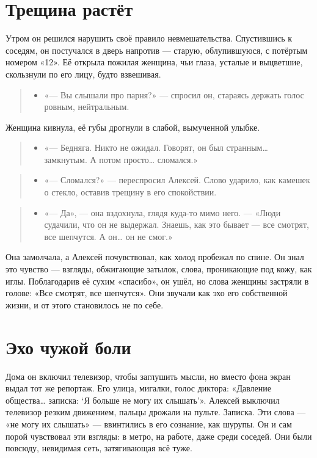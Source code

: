 \documentclass[12pt,a4paper]{book}
\newenvironment{dialogue}{\begin{quote}\itshape\begin{itemize}\item[]}{\end{itemize}\end{quote}}
\begin{document}
\section{Трещина растёт}

Утром он решился нарушить своё правило невмешательства. Спустившись к соседям, он постучался в дверь напротив — старую, облупившуюся, с потёртым номером «12». Её открыла пожилая женщина, чьи глаза, усталые и выцветшие, скользнули по его лицу, будто взвешивая.

\begin{dialogue}
«— Вы слышали про парня?» — спросил он, стараясь держать голос ровным, нейтральным.
\end{dialogue}

Женщина кивнула, её губы дрогнули в слабой, вымученной улыбке.

\begin{dialogue}
«— Бедняга. Никто не ожидал. Говорят, он был странным… замкнутым. А потом просто… сломался.»
\end{dialogue}

\begin{dialogue}
«— Сломался?» — переспросил Алексей. Слово ударило, как камешек о стекло, оставив трещину в его спокойствии.
\end{dialogue}

\begin{dialogue}
«— Да», — она вздохнула, глядя куда-то мимо него. — «Люди судачили, что он не выдержал. Знаешь, как это бывает — все смотрят, все шепчутся. А он… он не смог.»
\end{dialogue}

Она замолчала, а Алексей почувствовал, как холод пробежал по спине. Он знал это чувство — взгляды, обжигающие затылок, слова, проникающие под кожу, как иглы. Поблагодарив её сухим «спасибо», он ушёл, но слова женщины застряли в голове: «Все смотрят, все шепчутся». Они звучали как эхо его собственной жизни, и от этого становилось не по себе.

\section{Эхо чужой боли}

Дома он включил телевизор, чтобы заглушить мысли, но вместо фона экран выдал тот же репортаж. Его улица, мигалки, голос диктора: «Давление общества… записка: ‘Я больше не могу их слышать’». Алексей выключил телевизор резким движением, пальцы дрожали на пульте. Записка. Эти слова — «не могу их слышать» — ввинтились в его сознание, как шурупы. Он и сам порой чувствовал эти взгляды: в метро, на работе, даже среди соседей. Они были повсюду, невидимая сеть, затягивающая всё туже.
\end{document}
